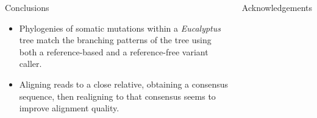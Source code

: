 \documentclass{beamer}
\begin{document}
\begin{frame}{}
\begin{columns}




\begin{block}{Conclusions}

\begin{itemize}
	\item Phylogenies of somatic mutations within a \textit{Eucalyptus} tree match the branching patterns of the tree using both a reference-based and a reference-free variant caller.
	\item Aligning reads to a close relative, obtaining a consensus sequence, then realigning to that consensus seems to improve alignment quality.
\end{itemize}

\end{block}


\begin{block}{Acknowledgements}



\end{block}
\end{columns}
\end{frame}
\end{document}
